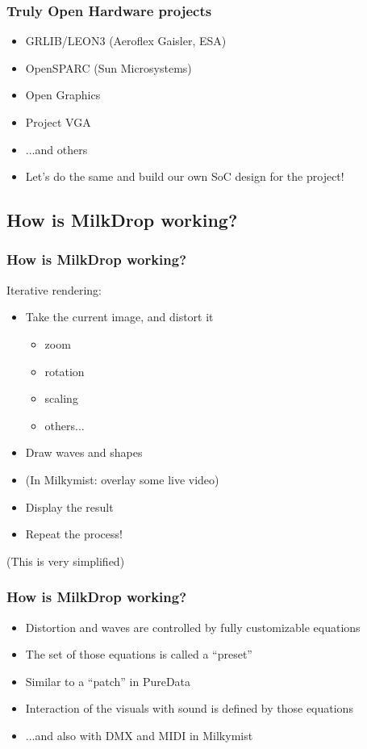 \documentclass{beamer}
\begin{document}
\frame
{
  \frametitle{Truly Open Hardware projects}

  \begin{itemize}
  \item GRLIB/LEON3 (Aeroflex Gaisler, ESA)
  \item OpenSPARC (Sun Microsystems)
  \item Open Graphics
  \item Project VGA
  \item ...and others
  \item Let's do the same and build our own SoC design for the project!
  \end{itemize}
}

\subsection{How is MilkDrop working?}
\frame
{
  \frametitle{How is MilkDrop working?}

Iterative rendering:
  \begin{itemize}
  \item Take the current image, and distort it
  \begin{itemize}
    \item zoom
    \item rotation
    \item scaling
    \item others...
  \end{itemize}
  \item Draw waves and shapes
  \item (In Milkymist: overlay some live video)
  \item Display the result
  \item Repeat the process!
  \end{itemize}
  (This is very simplified)
}

\frame
{
  \frametitle{How is MilkDrop working?}

  \begin{itemize}
  \item Distortion and waves are controlled by fully customizable equations
  \item The set of those equations is called a ``preset''
  \item Similar to a ``patch'' in PureData
  \item Interaction of the visuals with sound is defined by those equations
  \item ...and also with DMX and MIDI in Milkymist
  \end{itemize}
}
\end{document}
